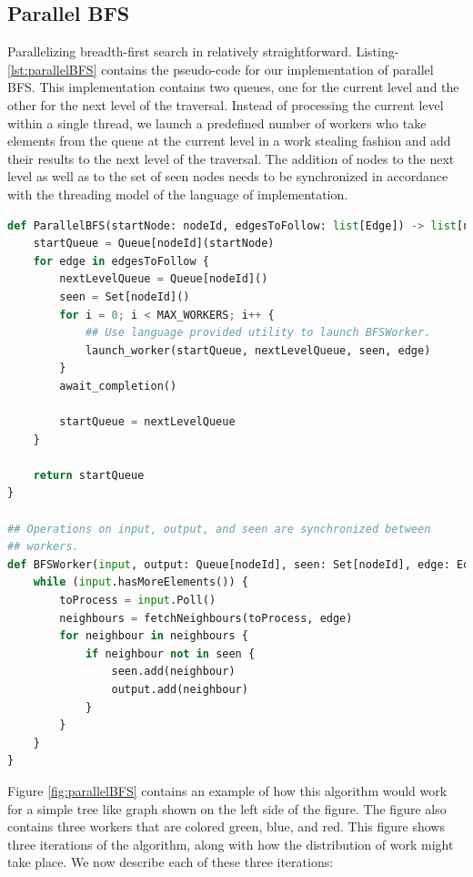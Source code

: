 \subsection{Parallel BFS}
Parallelizing breadth-first search in relatively straightforward.
Listing-\ref{lst:parallelBFS} contains the pseudo-code for our implementation of
parallel BFS. This implementation contains two queues, one for the current level
and the other for the next level of the traversal. Instead of processing the
current level within a single thread, we launch a predefined number of workers
who take elements from the queue at the current level in a work stealing
fashion and add their results to the next level of the traversal. The addition
of nodes to the next level as well as to the set of seen nodes needs to be
synchronized in accordance with the threading model of the language of
implementation.
\begin{lstlisting}[caption={Parallel BFS}, label={lst:parallelBFS}, captionpos=b, language=Python]
def ParallelBFS(startNode: nodeId, edgesToFollow: list[Edge]) -> list[nodeId] {
    startQueue = Queue[nodeId](startNode)
    for edge in edgesToFollow {
        nextLevelQueue = Queue[nodeId]()
        seen = Set[nodeId]()
        for i = 0; i < MAX_WORKERS; i++ {
            ## Use language provided utility to launch BFSWorker.
            launch_worker(startQueue, nextLevelQueue, seen, edge)
        }
        await_completion()

        startQueue = nextLevelQueue
    }

    return startQueue
}

## Operations on input, output, and seen are synchronized between
## workers. 
def BFSWorker(input, output: Queue[nodeId], seen: Set[nodeId], edge: Edge) {
    while (input.hasMoreElements()) {
        toProcess = input.Poll()
        neighbours = fetchNeighbours(toProcess, edge)
        for neighbour in neighbours {
            if neighbour not in seen {
                seen.add(neighbour)
                output.add(neighbour)
            }
        }
    }
}
\end{lstlisting}
Figure \ref{fig:parallelBFS} contains an example of how this algorithm would
work for a simple tree like graph shown on the left side of the figure. The
figure also contains three workers that are colored green, blue, and red.
This figure shows three iterations of the algorithm, along with how the
distribution of work might take place. We now describe each of these three
iterations:
